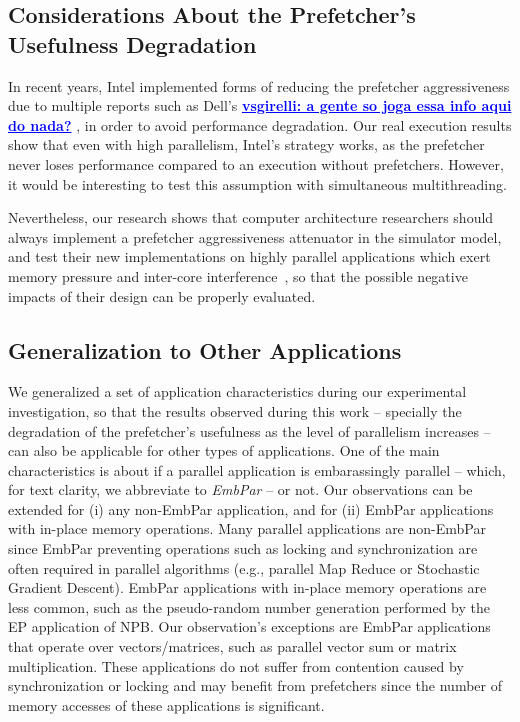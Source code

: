 \documentclass[AMA,final,STIX1COL]{WileyNJD-v2}
\newcommand{\vsg}[1]{\textcolor{blue}{\bfseries \ul{vsgirelli: #1} }\vspace{0.2cm}}
\begin{document}
\subsection{Considerations About the Prefetcher's Usefulness Degradation}
\label{subsec:pref_usefulness_thoughts}
In recent years, Intel implemented forms of reducing the prefetcher aggressiveness due to multiple reports such as Dell's \vsg{a gente so joga essa info aqui do nada?}, in order to avoid performance degradation.
Our real execution results show that even with high parallelism, Intel's strategy works, as the prefetcher never loses performance compared to an execution without prefetchers.
However, it would be interesting to test this assumption with simultaneous multithreading.

Nevertheless, our research shows that computer architecture researchers should always implement a prefetcher aggressiveness attenuator in the simulator model, and test their new implementations on highly parallel applications which exert memory pressure and inter-core interference~\cite{ebrahimi2009coordinated}, so that the possible negative impacts of their design can be properly evaluated.

\subsection{Generalization to Other Applications}
\label{subsec:other_apps}
We generalized a set of application characteristics during our experimental investigation, so that the results observed during this work -- specially the degradation of the prefetcher's usefulness as the level of parallelism increases -- can also be applicable for other types of applications. 
One of the main characteristics is about if a parallel application is embarassingly parallel -- which, for text clarity, we abbreviate to \textit{EmbPar} -- or not. 
Our observations can be extended for (i) any non-EmbPar application, and for (ii) EmbPar applications with in-place memory operations. Many parallel applications are non-EmbPar since EmbPar preventing operations such as locking and synchronization are often required in parallel algorithms (e.g., parallel Map Reduce or Stochastic Gradient Descent). EmbPar applications with in-place memory operations are less common, such as the pseudo-random number generation performed by the EP application of NPB. Our observation's exceptions are EmbPar applications that operate over vectors/matrices, such as parallel vector sum or matrix multiplication. These applications do not suffer from contention caused by synchronization or locking and may benefit from prefetchers since the number of memory accesses of these applications is significant.
\end{document}
